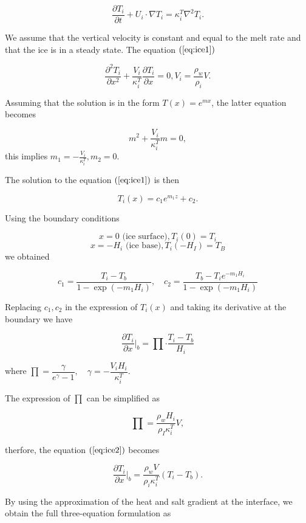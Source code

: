 \documentclass[11pt,a4paper]{article}
\begin{document}
		\begin{equation}
			\label{eq:ice1}
			\dfrac{\partial T_i}{\partial t} +U_i\cdot\nabla T_i = \kappa_i^T\nabla^2T_i.
		\end{equation}
		
		We assume that the vertical velocity is constant and equal to the melt rate and that the ice is in a steady state. The equation $(\ref{eq:ice1})$ 
		
		$$\dfrac{\partial^2 T_i}{\partial x^2} + \frac{V_i}{\kappa_i^T}\dfrac{\partial T_i}{\partial x} = 0, V_i = \frac{\rho_w}{\rho_i}V.$$
		
		Assuming that the solution is in the form $T(x) = e^{mx}$, the latter equation becomes 
		
		$$m^2+ \frac{V_i}{\kappa_i^T}m = 0,$$ this implies $m_1 = - \frac{V_i}{\kappa_i^T}, m_2 = 0.$
		
		The solution to the equation $(\ref{eq:ice1})$  is then 
		
		$$T_i(x) = c_1e^{m_1z}+c_2.$$
		
		Using the boundary conditions
		
		$$x = 0 \text{ (ice surface)}, T_i(0) = T_i$$
		$$x = -H_i \text{ (ice base)}, T_i(-H_I) = T_B$$ we obtained
		
		$$c_1 = \dfrac{T_i-T_b}{1-\exp(-m_1H_i)}, \quad c_2 = \dfrac{T_b-T_ie^{-m_1H_i}}{1-\exp(-m_1H_i)}$$
		
		Replacing $c_1, c_2$ in the expression of $T_i(x)$ and taking its derivative at the boundary we have
		
		\begin{equation}
			\label{eq:ice2}
			\dfrac{\partial T_i}{\partial x}\bigg|_b = \prod\cdot \dfrac{T_i-T_b}{H_i}
		\end{equation}
		
		where $\prod = \dfrac{\gamma}{e^{\gamma}-1}, \quad \gamma = -\dfrac{V_iH_i}{\kappa_i^T}.$
		
		The expression of $\prod$ can be simplified as 
		
		$$\prod = \dfrac{\rho_wH_i}{\rho_I\kappa_i^T}V,$$
		
		therfore, the equation $(\ref{eq:ice2})$ becomes
		
		\begin{equation}
			\label{eq:16}
			\dfrac{\partial T_i}{\partial x}\bigg|_b = \dfrac{\rho_wV}{\rho_i\kappa_i^T}\left( T_i-T_b\right).
		\end{equation}
	
		By using the approximation of the heat and salt gradient at the interface, we obtain the full three-equation formulation as
		
\end{document}
